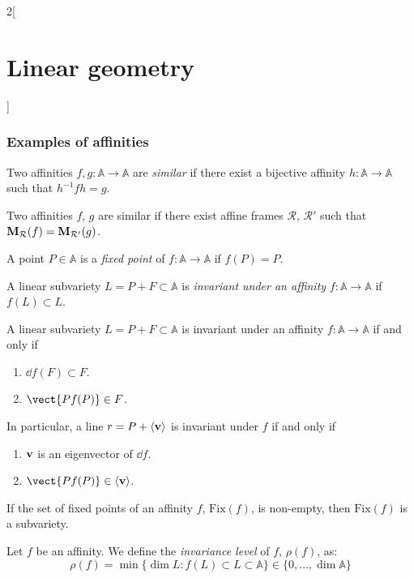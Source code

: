 \documentclass[../../../main_math.tex]{subfiles}
\begin{document}
\begin{multicols}{2}[\section{Linear geometry}]
  \subsubsection{Examples of affinities}
  \begin{definition}
    Two affinities $f,g:\mathbb{A}\rightarrow\mathbb{A}$ are \emph{similar} if there exist a bijective affinity $h:\mathbb{A}\rightarrow\mathbb{A}$ such that $h^{-1}fh=g$.
  \end{definition}
  \begin{proposition}
    Two affinities $f$, $g$ are similar if there exist affine frames $\mathcal{R}$, $\mathcal{R}'$ such that $\boldsymbol{\mathrm{M}}_\mathcal{R}(f)=\boldsymbol{\mathrm{M}}_{\mathcal{R}'}(g)$.
  \end{proposition}
  \begin{definition}
    A point $P\in\mathbb{A}$ is a \emph{fixed point} of $f:\mathbb{A}\rightarrow\mathbb{A}$ if $f(P)=P$.
  \end{definition}
  \begin{definition}
    A linear subvariety $L=P+F\subset\mathbb{A}$ is \emph{invariant under an affinity} $f:\mathbb{A}\rightarrow\mathbb{A}$ if $f(L)\subset L$.
  \end{definition}
  \begin{proposition}
    A linear subvariety $L=P+F\subset\mathbb{A}$ is invariant under an affinity $f:\mathbb{A}\rightarrow\mathbb{A}$ if and only if
    \begin{enumerate}
      \item $\dd{f(F)}\subset F$.
      \item $\vect{Pf(P)}\in F$.
    \end{enumerate} In particular, a line $r=P+\langle\boldsymbol{\mathrm{v}}\rangle$ is invariant under $f$ if and only if
    \begin{enumerate}
      \item $\boldsymbol{\mathrm{v}}$ is an eigenvector of $\dd{f}$.
      \item $\vect{Pf(P)}\in\langle\vf{v}\rangle$.
    \end{enumerate}
  \end{proposition}
  \begin{proposition}
    If the set of fixed points of an affinity $f$, $\text{Fix}(f)$, is non-empty, then $\text{Fix}(f)$ is a subvariety.
  \end{proposition}
  \begin{definition}
    Let $f$ be an affinity. We define the \emph{invariance level} of $f$, $\rho(f)$, as: $$\rho(f)=\min\{\dim L:f(L)\subset L\subset\mathbb{A}\}\in\{0,\ldots,\dim\mathbb{A}\}$$

\end{definition}
\end{multicols}
\end{document}

